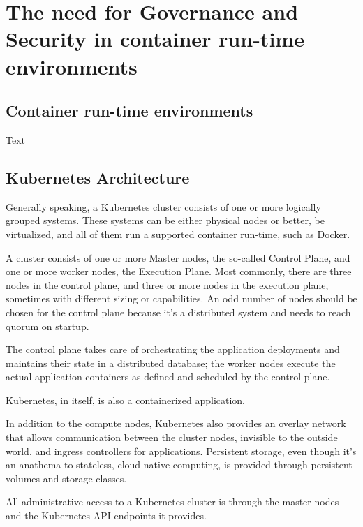 %
%

\pagebreak
\section{The need for Governance and Security in container run-time environments}

\onehalfspacing

\subsection{Container run-time environments}

Text

\subsection{Kubernetes Architecture}

Generally speaking, a Kubernetes cluster consists of one or more logically grouped systems. These systems can be either physical nodes or better, be virtualized, and all of them run a supported container run-time, such as Docker.

A cluster consists of one or more Master nodes, the so-called Control Plane, and one or more worker nodes, the Execution Plane. Most commonly, there are three nodes in the control plane, and three or more nodes in the execution plane, sometimes with different sizing or capabilities. An odd number of nodes should be chosen for the control plane because it's a distributed system and needs to reach quorum on startup.

The control plane takes care of orchestrating the application deployments and maintains their state in a distributed database; the worker nodes execute the actual application containers as defined and scheduled by the control plane.

Kubernetes, in itself, is also a containerized application.

In addition to the compute nodes, Kubernetes also provides an overlay network that allows communication between the cluster nodes, invisible to the outside world, and ingress controllers for applications. Persistent storage, even though it's an anathema to stateless, cloud-native computing, is provided through persistent volumes and storage classes.

All administrative access to a Kubernetes cluster is through the master nodes and the Kubernetes API endpoints it provides.


